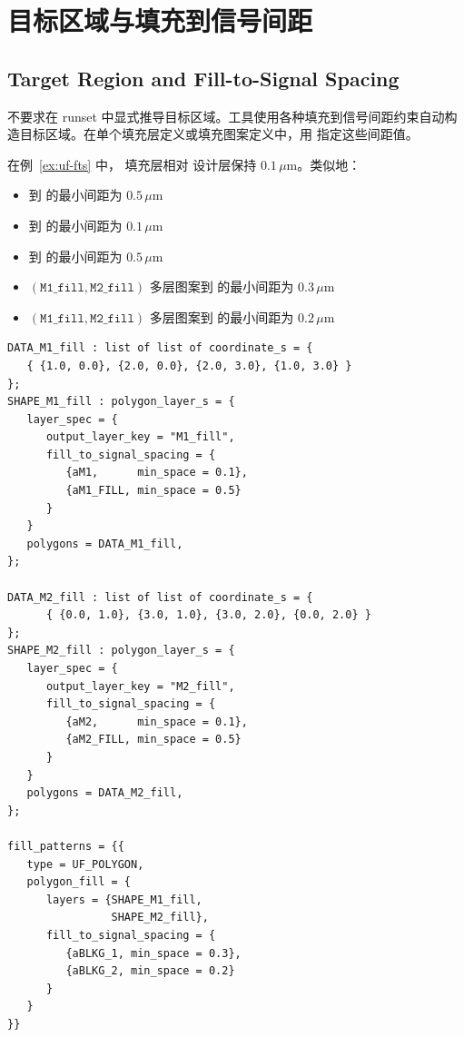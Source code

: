 \section{目标区域与填充到信号间距}
\subsection*{Target Region and Fill-to-Signal Spacing}

 不要求在 runset 中显式推导目标区域。工具使用各种填充到信号间距约束自动构造目标区域。在单个填充层定义或填充图案定义中，用  指定这些间距值。

在例~\ref{ex:uf-fts} 中， 填充层相对  设计层保持 $0.1\,\mu\mathrm{m}$。类似地：
\begin{itemize}
  \item {} 到  的最小间距为 $0.5\,\mu\mathrm{m}$
  \item {} 到  的最小间距为 $0.1\,\mu\mathrm{m}$
  \item {} 到  的最小间距为 $0.5\,\mu\mathrm{m}$
  \item $(\texttt{M1\_fill},\texttt{M2\_fill})$ 多层图案到  的最小间距为 $0.3\,\mu\mathrm{m}$
  \item $(\texttt{M1\_fill},\texttt{M2\_fill})$ 多层图案到  的最小间距为 $0.2\,\mu\mathrm{m}$
\end{itemize}

\begin{lstlisting}[style=pxl,caption={fill\_to\_signal\_spacing 选项示例},label={ex:uf-fts}]
DATA_M1_fill : list of list of coordinate_s = {
   { {1.0, 0.0}, {2.0, 0.0}, {2.0, 3.0}, {1.0, 3.0} }
};
SHAPE_M1_fill : polygon_layer_s = {
   layer_spec = {
      output_layer_key = "M1_fill",
      fill_to_signal_spacing = {
         {aM1,      min_space = 0.1},
         {aM1_FILL, min_space = 0.5}
      }
   }
   polygons = DATA_M1_fill,
};

DATA_M2_fill : list of list of coordinate_s = {
      { {0.0, 1.0}, {3.0, 1.0}, {3.0, 2.0}, {0.0, 2.0} }
};
SHAPE_M2_fill : polygon_layer_s = {
   layer_spec = {
      output_layer_key = "M2_fill",
      fill_to_signal_spacing = {
         {aM2,      min_space = 0.1},
         {aM2_FILL, min_space = 0.5}
      }
   }
   polygons = DATA_M2_fill,
};

fill_patterns = {{
   type = UF_POLYGON,
   polygon_fill = {
      layers = {SHAPE_M1_fill,
                SHAPE_M2_fill},
      fill_to_signal_spacing = {
         {aBLKG_1, min_space = 0.3},
         {aBLKG_2, min_space = 0.2}
      }
   }
}}
\end{lstlisting}


